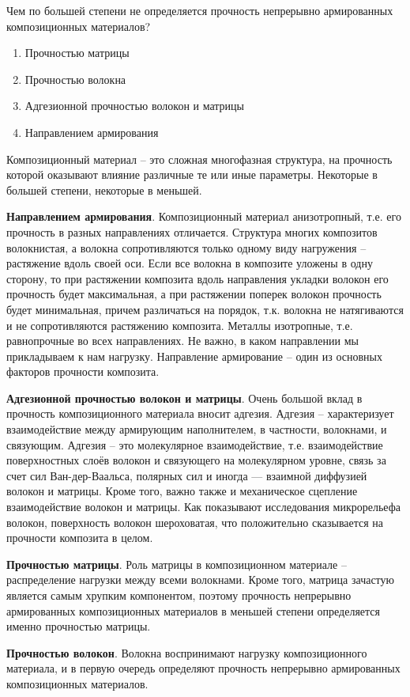 
Чем по большей степени не определяется прочность непрерывно армированных композиционных материалов?

\begin{enumerate}
    \item Прочностью матрицы
    \item Прочностью волокна
    \item Адгезионной прочностью волокон и матрицы
    \item Направлением армирования
\end{enumerate}

\explanationSection

Композиционный материал – это сложная многофазная структура, на прочность которой оказывают влияние различные те или иные параметры. Некоторые в большей степени, некоторые в меньшей. 

\textbf{Направлением армирования}. Композиционный материал анизотропный, т.е. его прочность в разных направлениях отличается. Структура многих композитов волокнистая, а волокна сопротивляются только одному виду нагружения – растяжение вдоль своей оси. Если все волокна в композите уложены в одну сторону, то при растяжении композита вдоль направления укладки волокон его прочность будет максимальная, а при растяжении поперек волокон прочность будет минимальная, причем различаться на порядок, т.к. волокна не натягиваются и не сопротивляются растяжению композита. Металлы изотропные, т.е. равнопрочные во всех направлениях. Не важно, в каком направлении мы прикладываем к нам нагрузку. Направление армирование – один из основных факторов прочности композита.

\textbf{Адгезионной прочностью волокон и матрицы}. Очень большой вклад в прочность композиционного материала вносит адгезия. Адгезия – характеризует взаимодействие между армирующим наполнителем, в частности, волокнами, и связующим. Адгезия – это молекулярное взаимодействие, т.е. взаимодействие поверхностных слоёв волокон и связующего на молекулярном уровне, связь за счет сил Ван-дер-Ваальса, полярных сил и иногда — взаимной диффузией волокон и матрицы. Кроме того, важно также и механическое сцепление взаимодействие волокон и матрицы. Как показывают исследования микрорельефа волокон, поверхность волокон шероховатая, что положительно сказывается на прочности композита в целом.

\textbf{Прочностью матрицы}. Роль матрицы в композиционном материале – распределение нагрузки между всеми волокнами. Кроме того, матрица зачастую является самым хрупким компонентом, поэтому прочность непрерывно армированных композиционных материалов в меньшей степени определяется именно прочностью матрицы.

\textbf{Прочностью волокон}. Волокна воспринимают нагрузку композиционного материала, и в первую очередь определяют прочность непрерывно армированных композиционных материалов. 

